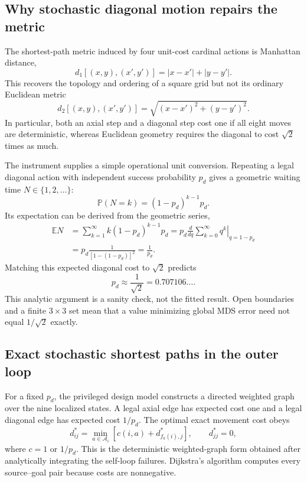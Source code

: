 \documentclass[11pt]{article}
\newcommand{\E}{\mathbb E}
\newcommand{\Prob}{\mathbb P}
\begin{document}
\subsection{Why stochastic diagonal motion repairs the metric}

The shortest-path metric induced by four unit-cost cardinal actions is
Manhattan distance,
\begin{equation}
 d_1[(x,y),(x',y')]=|x-x'|+|y-y'|.
 \label{eq:manhattan}
\end{equation}
This recovers the topology and ordering of a square grid but not its ordinary
Euclidean metric
\begin{equation}
 d_2[(x,y),(x',y')]=
 \sqrt{(x-x')^2+(y-y')^2}.
 \label{eq:euclidean-grid}
\end{equation}
In particular, both an axial step and a diagonal step cost one if all eight
moves are deterministic, whereas Euclidean geometry requires the diagonal to
cost $\sqrt2$ times as much.

The instrument supplies a simple operational unit conversion. Repeating a
legal diagonal action with independent success probability $p_d$ gives a
geometric waiting time $N\in\{1,2,\ldots\}$:
\begin{equation}
 \Prob(N=k)=(1-p_d)^{k-1}p_d.
 \end{equation}
Its expectation can be derived from the geometric series,
\begin{align}
 \E N
 &=\sum_{k=1}^\infty k(1-p_d)^{k-1}p_d
 =p_d\frac{d}{dq}\left.\sum_{k=0}^\infty q^k\right|_{q=1-p_d}\\
 &=p_d\frac{1}{[1-(1-p_d)]^2}=\frac1{p_d}.
 \label{eq:geometric-cost}
\end{align}
Matching this expected diagonal cost to $\sqrt2$ predicts
\begin{equation}
 p_d\approx\frac1{\sqrt2}=0.707106\ldots.
 \label{eq:diagonal-prediction}
\end{equation}
This analytic argument is a sanity check, not the fitted result. Open
boundaries and a finite $3\times3$ set mean that a value minimizing global MDS
error need not equal $1/\sqrt2$ exactly.

\subsection{Exact stochastic shortest paths in the outer loop}

For a fixed $p_d$, the privileged design model constructs a directed weighted
graph over the nine localized states. A legal axial edge has expected cost one
and a legal diagonal edge has expected cost $1/p_d$. The optimal exact movement
cost obeys
\begin{equation}
 d^*_{ij}=\min_{a\in\mathcal A_i}
 \left[c(i,a)+d^*_{f_a(i),j}\right],\qquad d^*_{jj}=0,
 \label{eq:grid-shortest-path}
\end{equation}
where $c=1$ or $1/p_d$. This is the deterministic weighted-graph form obtained
after analytically integrating the self-loop failures. Dijkstra's algorithm
computes every source--goal pair because costs are nonnegative.
\end{document}
